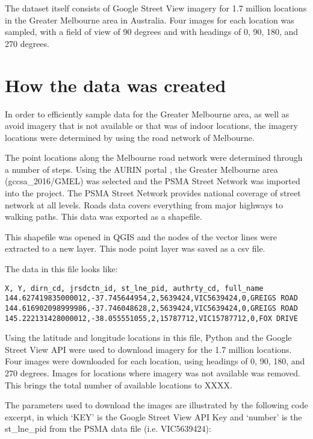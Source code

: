 \documentclass[final,3p,times,authoryear]{elsarticle}
\begin{document}
The dataset itself consists of Google Street View imagery for 1.7 million locations in the Greater Melbourne area in Australia. Four images for each location was sampled, with a field of view of 90 degrees and with headings of 0, 90, 180, and 270 degrees.


\section{How the data was created}\label{sec:create}
In order to efficiently sample data for the Greater Melbourne area, as well as avoid imagery that is not available or that was of indoor locations, the imagery locations were determined by using the road network of Melbourne.

The point locations along the Melbourne road network were determined through a number of steps. Using the AURIN portal \citep{Aurin2018}, the Greater Melbourne area (gccsa\_2016/GMEL) was selected and the PSMA Street Network \citep{PSMA2018} was imported into the project. The PSMA Street Network provides national coverage of street network at all levels. Roads data covers everything from major highways to walking paths. This data was exported as a shapefile.

This shapefile was opened in QGIS \citep{QGIS2009} and the nodes of the vector lines were extracted to a new layer. This node point layer was saved as a csv file.

The data in this file looks like:
\begin{verbatim}
X, Y, dirn_cd, jrsdctn_id, st_lne_pid, authrty_cd, full_name
144.627419835000012,-37.745644954,2,5639424,VIC5639424,0,GREIGS ROAD
144.616902098999986,-37.746048628,2,5639424,VIC5639424,0,GREIGS ROAD
145.222131428000012,-38.055551055,2,15787712,VIC15787712,0,FOX DRIVE
\end{verbatim}

Using the latitude and longitude locations in this file, Python and the Google Street View API \citep{GoogleMaps2017b} were used to download imagery for the 1.7 million locations. Four images were downloaded for each location, using headings of 0, 90, 180, and 270 degrees. Images for locations where imagery was not available was removed. This brings the total number of available locations to XXXX.

The parameters used to download the images are illustrated by the following code excerpt, in which `KEY' is the Google Street View API Key and `number' is the st\_lne\_pid from the PSMA data file (i.e. VIC5639424):
\end{document}
